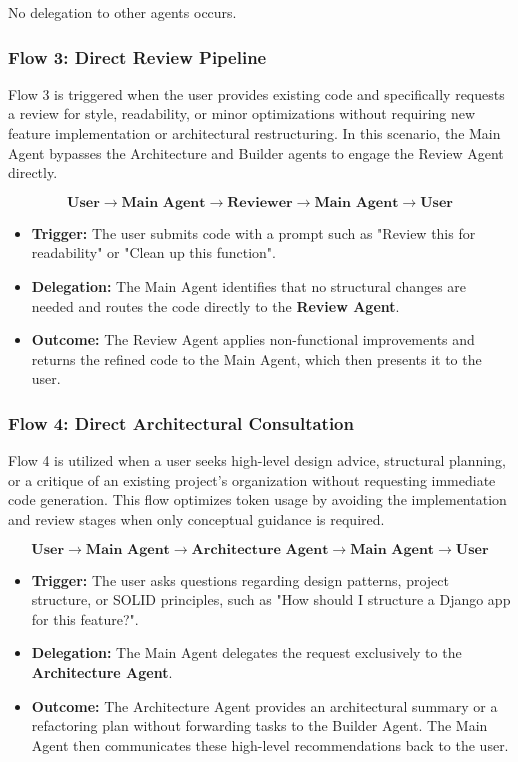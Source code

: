 \documentclass[12pt,a4paper]{article}
\begin{document}
No delegation to other agents occurs.

\subsubsection{Flow 3: Direct Review Pipeline}

Flow 3 is triggered when the user provides existing code and specifically requests a review for style, readability, or minor optimizations without requiring new feature implementation or architectural restructuring. In this scenario, the Main Agent bypasses the Architecture and Builder agents to engage the Review Agent directly.

\[
\textbf{User} \rightarrow \textbf{Main Agent} \rightarrow \textbf{Reviewer} \rightarrow \textbf{Main Agent} \rightarrow \textbf{User} 
\]

\begin{itemize} \item \textbf{Trigger:} The user submits code with a prompt such as "Review this for readability" or "Clean up this function". \item \textbf{Delegation:} The Main Agent identifies that no structural changes are needed and routes the code directly to the \textbf{Review Agent}. \item \textbf{Outcome:} The Review Agent applies non-functional improvements and returns the refined code to the Main Agent, which then presents it to the user. \end{itemize}

\subsubsection{Flow 4: Direct Architectural Consultation}

Flow 4 is utilized when a user seeks high-level design advice, structural planning, or a critique of an existing project's organization without requesting immediate code generation. This flow optimizes token usage by avoiding the implementation and review stages when only conceptual guidance is required.

\[
\textbf{User} \rightarrow \textbf{Main Agent} \rightarrow \textbf{Architecture Agent} \rightarrow \textbf{Main Agent} \rightarrow \textbf{User} 
\]

\begin{itemize} \item \textbf{Trigger:} The user asks questions regarding design patterns, project structure, or SOLID principles, such as "How should I structure a Django app for this feature?". \item \textbf{Delegation:} The Main Agent delegates the request exclusively to the \textbf{Architecture Agent}. \item \textbf{Outcome:} The Architecture Agent provides an architectural summary or a refactoring plan without forwarding tasks to the Builder Agent. The Main Agent then communicates these high-level recommendations back to the user. \end{itemize}
\end{document}

